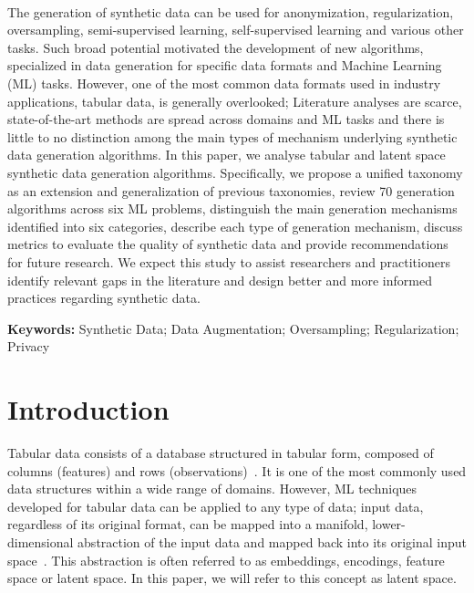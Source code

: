 ~\label{chp:synthetic-data-review}
\graphicspath{{figures/synthetic-data-review/}}

\begin{adjustwidth}{30pt}{30pt}

    The generation of synthetic data can be used for anonymization,
    regularization, oversampling, semi-supervised learning, self-supervised
    learning and various other tasks. Such broad potential motivated the
    development of new algorithms, specialized in data generation for specific
    data formats and Machine Learning (ML) tasks. However, one of the most
    common data formats used in industry applications, tabular data, is
    generally overlooked; Literature analyses are scarce, state-of-the-art
    methods are spread across domains and ML tasks and there is little to no
    distinction among the main types of mechanism underlying synthetic data
    generation algorithms. In this paper, we analyse tabular and latent space
    synthetic data generation algorithms. Specifically, we propose a unified
    taxonomy as an extension and generalization of previous taxonomies, review
    70 generation algorithms across six ML problems, distinguish the main
    generation mechanisms identified into six categories, describe each type
    of generation mechanism, discuss metrics to evaluate the quality of
    synthetic data and provide recommendations for future research. We expect
    this study to assist researchers and practitioners identify relevant gaps
    in the literature and design better and more informed practices regarding
    synthetic data.

\end{adjustwidth}

\vspace{.5cm}
\textbf{Keywords:} Synthetic Data; Data Augmentation; Oversampling;
Regularization; Privacy

\section{Introduction}\label{sec:introduction-synth}

Tabular data consists of a database structured in tabular form, composed of
columns (features) and rows (observations)~\cite{yoon2020vime}. It is one of
the most commonly used data structures within a wide range of domains.
However, ML techniques developed for tabular data can be applied to any type
of data; input data, regardless of its original format, can be mapped into a
manifold, lower-dimensional abstraction of the input data and mapped back into
its original input space~\cite{kingma2019introduction, DeVries2017}.
This abstraction is often referred to as embeddings, encodings, feature
space or latent space. In this paper, we will refer to this concept as
latent space.

